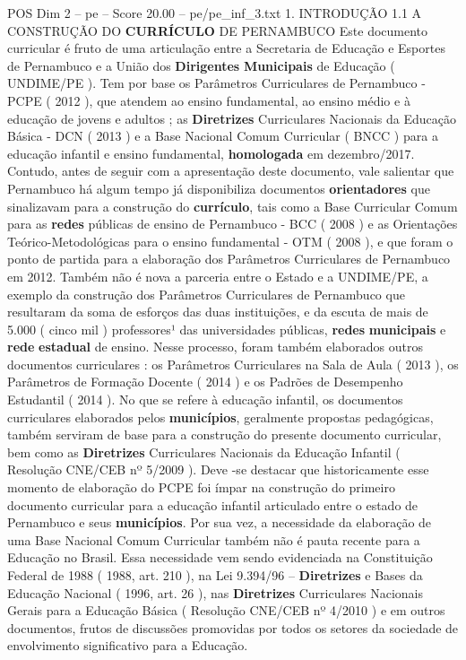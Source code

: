 \begin{textsample}{POS Dim 2 – pe – Score 20.00 – pe/pe\_inf\_3.txt}  \label{ex:f2_pos_253}
1.
INTRODUÇÃO 1.1 A CONSTRUÇÃO DO \textbf{CURRÍCULO} DE PERNAMBUCO Este documento curricular é fruto de uma articulação entre a Secretaria de Educação e Esportes de Pernambuco e a União dos \textbf{Dirigentes} \textbf{Municipais} de Educação ( UNDIME/PE ).
Tem por base os Parâmetros Curriculares de Pernambuco - PCPE ( 2012 ), que atendem ao ensino fundamental, ao ensino médio e à educação de jovens e adultos ; as \textbf{Diretrizes} Curriculares Nacionais da Educação Básica - DCN ( 2013 ) e a Base Nacional Comum Curricular ( BNCC ) para a educação infantil e ensino fundamental, \textbf{homologada} em dezembro/2017.
Contudo, antes de seguir com a apresentação deste documento, vale salientar que Pernambuco há algum tempo já disponibiliza documentos \textbf{orientadores} que sinalizavam para a construção do \textbf{currículo}, tais como a Base Curricular Comum para as \textbf{redes} públicas de ensino de Pernambuco - BCC ( 2008 ) e as Orientações Teórico-Metodológicas para o ensino fundamental - OTM ( 2008 ), e que foram o ponto de partida para a elaboração dos Parâmetros Curriculares de Pernambuco em 2012.
Também não é nova a parceria entre o Estado e a UNDIME/PE, a exemplo da construção dos Parâmetros Curriculares de Pernambuco que resultaram da soma de esforços das duas instituições, e da escuta de mais de 5.000 ( cinco mil ) professores¹ das universidades públicas, \textbf{redes} \textbf{municipais} e \textbf{rede} \textbf{estadual} de ensino.
Nesse processo, foram também elaborados outros documentos curriculares : os Parâmetros Curriculares na Sala de Aula ( 2013 ), os Parâmetros de Formação Docente ( 2014 ) e os Padrões de Desempenho Estudantil ( 2014 ).
No que se refere à educação infantil, os documentos curriculares elaborados pelos \textbf{municípios}, geralmente propostas pedagógicas, também serviram de base para a construção do presente documento curricular, bem como as \textbf{Diretrizes} Curriculares Nacionais da Educação Infantil ( Resolução CNE/CEB nº 5/2009 ).
Deve -se destacar que historicamente esse momento de elaboração do PCPE foi ímpar na construção do primeiro documento curricular para a educação infantil articulado entre o estado de Pernambuco e seus \textbf{municípios}.
Por sua vez, a necessidade da elaboração de uma Base Nacional Comum Curricular também não é pauta recente para a Educação no Brasil.
Essa necessidade vem sendo evidenciada na Constituição Federal de 1988 ( 1988, art. 210 ), na Lei 9.394/96 – \textbf{Diretrizes} e Bases da Educação Nacional ( 1996, art. 26 ), nas \textbf{Diretrizes} Curriculares Nacionais Gerais para a Educação Básica ( Resolução CNE/CEB nº 4/2010 ) e em outros documentos, frutos de discussões promovidas por todos os setores da sociedade de envolvimento significativo para a Educação.

\end{textsample}
